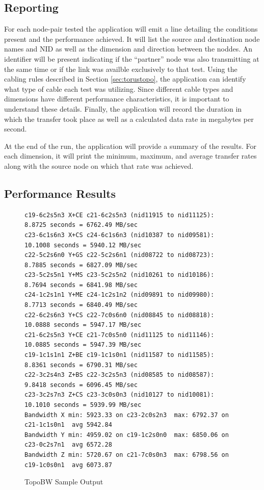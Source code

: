 \documentclass[10pt, conference, compsocconf]{IEEEtran}
\begin{document}
\subsection{Reporting}

For each node-pair tested the application will emit a line detailing the
conditions present and the performance achieved.  It will list the source and
destination node names and NID as well as the dimension and direction between
the noddes.  An identifier will be present indicating if the ``partner'' node
was also transmitting at the same time or if the link was availble exclusively
to that test.  Using the cabling rules described in Section
\ref{sec:torustopo}, the application can identify what type of cable each test
was utilizing.  Since different cable types and dimensions have different
performance characteristics, it is important to understand these details.
Finally, the application will record the duration in which the transfer took
place as well as a calculated data rate in megabytes per second.

At the end of the run, the application will provide a summary of the results.
For each dimension, it will print the minimum, maximum, and average transfer
rates along with the source node on which that rate was achieved.

\subsection{Performance Results}


\begin{figure}[ht]
  \begin{verbatim}
c19-6c2s5n3 X+CE c21-6c2s5n3 (nid11915 to nid11125):  8.8725 seconds = 6762.49 MB/sec
c23-6c1s6n3 X+CS c24-6c1s6n3 (nid10387 to nid09581): 10.1008 seconds = 5940.12 MB/sec
c22-5c2s6n0 Y+GS c22-5c2s6n1 (nid08722 to nid08723):  8.7885 seconds = 6827.09 MB/sec
c23-5c2s5n1 Y+MS c23-5c2s5n2 (nid10261 to nid10186):  8.7694 seconds = 6841.98 MB/sec
c24-1c2s1n1 Y+ME c24-1c2s1n2 (nid09891 to nid09980):  8.7713 seconds = 6840.49 MB/sec
c22-6c2s6n3 Y+CS c22-7c0s6n0 (nid08845 to nid08818): 10.0888 seconds = 5947.17 MB/sec
c21-6c2s5n3 Y+CE c21-7c0s5n0 (nid11125 to nid11146): 10.0885 seconds = 5947.39 MB/sec
c19-1c1s1n1 Z+BE c19-1c1s0n1 (nid11587 to nid11585):  8.8361 seconds = 6790.31 MB/sec
c22-3c2s4n3 Z+BS c22-3c2s5n3 (nid08585 to nid08587):  9.8418 seconds = 6096.45 MB/sec
c23-3c2s7n3 Z+CS c23-3c0s0n3 (nid10127 to nid10081): 10.1010 seconds = 5939.99 MB/sec
Bandwidth X min: 5923.33 on c23-2c0s2n3  max: 6792.37 on c21-1c1s0n1  avg 5942.84
Bandwidth Y min: 4959.02 on c19-1c2s0n0  max: 6850.06 on c23-0c2s7n1  avg 6572.28
Bandwidth Z min: 5720.67 on c21-7c0s0n3  max: 6798.56 on c19-1c0s0n1  avg 6073.87
  \end{verbatim}
  \caption{TopoBW Sample Output}\label{fig:topobwresults}
\end{figure}
\end{document}

